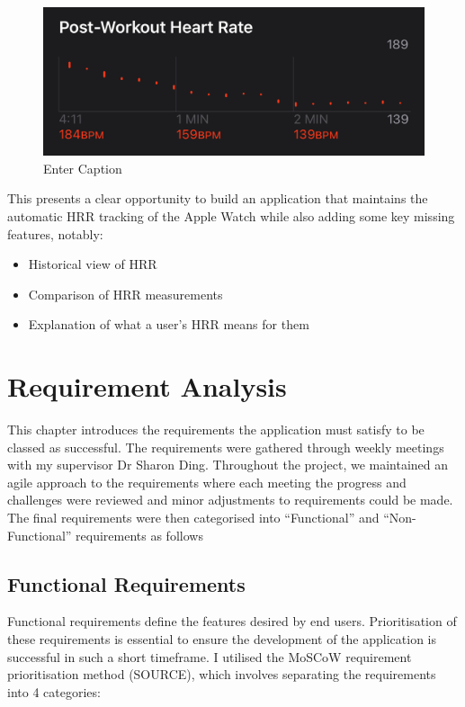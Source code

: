 \documentclass{l4proj}
\begin{document}
\begin{figure}[h!]
    \centering
    \includegraphics[width=0.5\linewidth]{dissertation//dissImages/AppleWatchHRR.png}
    \caption{Enter Caption}
    \label{fig:enter-label}
\end{figure}

This presents a clear opportunity to build an application that maintains the automatic HRR tracking of the Apple Watch while also adding some key missing features, notably:

\begin{itemize}
    \item Historical view of HRR
    \item Comparison of HRR measurements
    \item Explanation of what a user’s HRR means for them
\end{itemize}

\chapter{Requirement Analysis}
\label{sec:requirements}

This chapter introduces the requirements the application must satisfy to be classed as successful. The requirements were gathered through weekly meetings with my supervisor Dr Sharon Ding. Throughout the project, we maintained an agile approach to the requirements where each meeting the progress and challenges were reviewed and minor adjustments to requirements could be made. The final requirements were then categorised into “Functional” and “Non-Functional” requirements as follows

\section{Functional Requirements}
\label{sec:functionalreqs}

Functional requirements define the features desired by end users. Prioritisation of these requirements is essential to ensure the development of the application is successful in such a short timeframe. I utilised the MoSCoW requirement prioritisation method (SOURCE), which involves separating the requirements into 4 categories:
\end{document}
